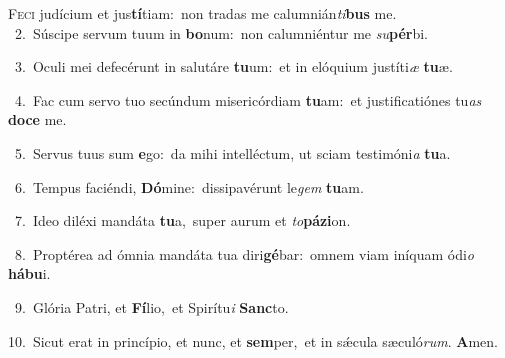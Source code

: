 \lettrine{\initial\textcolor{\initialcolor}{F}}{eci} judícium et jus\-\textbf{tí}\-tiam:~\star non tradas me calumnián\-\textit{ti}\-\textbf{bus} me.\\
{\numbfont\textcolor{\numbcolor}{~2.}}~Súscipe servum tuum in \textbf{bo}\-num:~\star non calumniéntur me \textit{su}\-\textbf{pér}bi.\par
{\numbfont\textcolor{\numbcolor}{~3.}}~Oculi mei defecérunt in salutáre \textbf{tu}\-um:~\star et in elóquium justíti\textit{æ} \textbf{tu}\-æ.\par
{\numbfont\textcolor{\numbcolor}{~4.}}~Fac cum servo tuo secúndum misericórdiam \textbf{tu}\-am:~\star et justificatiónes tu\textit{as} \textbf{do}\-\textbf{ce} me.\par
{\numbfont\textcolor{\numbcolor}{~5.}}~Servus tuus sum \textbf{e}\-go:~\star da mihi intelléctum, ut sciam testimóni\textit{a} \textbf{tu}\-a.\par
{\numbfont\textcolor{\numbcolor}{~6.}}~Tempus faciéndi, \textbf{Dó}\-mine:~\star dissipavérunt le\textit{gem} \textbf{tu}\-am.\par
{\numbfont\textcolor{\numbcolor}{~7.}}~Ideo diléxi mandáta \textbf{tu}\-a,~\star super aurum et \textit{to}\-\textbf{pá}\textbf{zi}on.\par
{\numbfont\textcolor{\numbcolor}{~8.}}~Proptérea ad ómnia mandáta tua diri\-\textbf{gé}\-bar:~\star omnem viam iníquam ódi\textit{o} \textbf{há}\-\textbf{bu}i.\par
{\numbfont\textcolor{\numbcolor}{~9.}}~Glória Patri, et \textbf{Fí}\-lio,~\star et Spirítu\textit{i} \textbf{Sanc}\-to.\par
{\numbfont\textcolor{\numbcolor}{10.}}~Sicut erat in princípio, et nunc, et \textbf{sem}\-per,~\star et in sǽcula sæculó\-\textit{rum}\-. \textbf{A}\-men.\par

